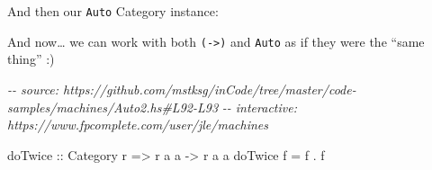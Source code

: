 \documentclass[]{article}
\newenvironment{Shaded}{}{}
\newcommand{\CommentTok}[1]{\textcolor[rgb]{0.38,0.63,0.69}{\textit{#1}}}
\newcommand{\DataTypeTok}[1]{\textcolor[rgb]{0.56,0.13,0.00}{#1}}
\newcommand{\FunctionTok}[1]{\textcolor[rgb]{0.02,0.16,0.49}{#1}}
\newcommand{\KeywordTok}[1]{\textcolor[rgb]{0.00,0.44,0.13}{\textbf{#1}}}
\newcommand{\NormalTok}[1]{#1}
\newcommand{\OperatorTok}[1]{\textcolor[rgb]{0.40,0.40,0.40}{#1}}
\newcommand{\OtherTok}[1]{\textcolor[rgb]{0.00,0.44,0.13}{#1}}
\begin{document}
And then our \texttt{Auto} Category instance:

\begin{Shaded}
\end{Shaded}

And now\ldots{} we can work with both \texttt{(-\textgreater{})} and
\texttt{Auto} as if they were the ``same thing'' :)

\begin{Shaded}
\begin{Highlighting}[]
\CommentTok{{-}{-} source: https://github.com/mstksg/inCode/tree/master/code{-}samples/machines/Auto2.hs\#L92{-}L93}
\CommentTok{{-}{-} interactive: https://www.fpcomplete.com/user/jle/machines}

\OtherTok{doTwice ::} \DataTypeTok{Category}\NormalTok{ r }\OtherTok{=>}\NormalTok{ r a a }\OtherTok{{-}>}\NormalTok{ r a a}
\NormalTok{doTwice f }\OtherTok{=}\NormalTok{ f }\OperatorTok{.}\NormalTok{ f}
\end{Highlighting}
\end{Shaded}
\end{document}
